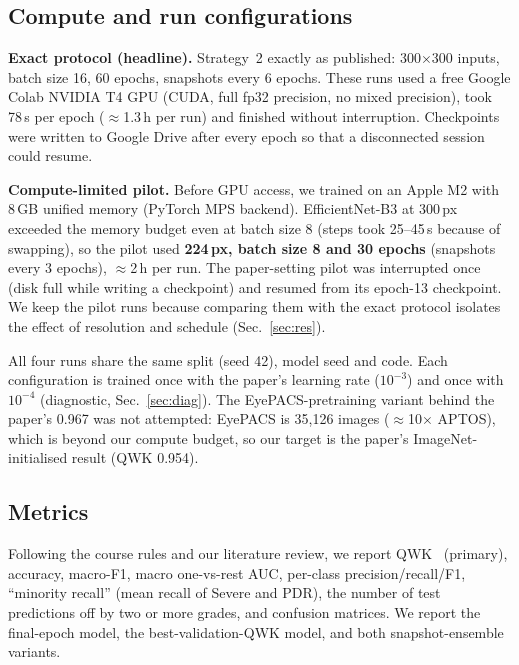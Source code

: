 \subsection{Compute and run configurations}
\textbf{Exact protocol (headline).} Strategy~2 exactly as published: 300$\times$300 inputs, batch size 16,
60 epochs, snapshots every 6 epochs. These runs used a free Google Colab NVIDIA T4 GPU (CUDA, full fp32
precision, no mixed precision), took 78\,s per epoch ($\approx$1.3\,h per run) and finished without interruption.
Checkpoints were written to Google Drive after every epoch so that a disconnected session could resume.

\textbf{Compute-limited pilot.} Before GPU access, we trained on an Apple M2 with 8\,GB unified memory (PyTorch
MPS backend). EfficientNet-B3 at 300\,px exceeded the memory budget even at batch size 8 (steps took 25--45\,s
because of swapping), so the pilot used \textbf{224\,px, batch size 8 and 30 epochs} (snapshots every 3 epochs),
$\approx$2\,h per run. The paper-setting pilot was interrupted once (disk full while writing a checkpoint) and
resumed from its epoch-13 checkpoint. We keep the pilot runs because comparing them with the exact protocol
isolates the effect of resolution and schedule (Sec.~\ref{sec:res}).

All four runs share the same split (seed 42), model seed and code. Each configuration is trained once with the
paper's learning rate ($10^{-3}$) and once with $10^{-4}$ (diagnostic, Sec.~\ref{sec:diag}).
The EyePACS-pretraining variant behind the paper's 0.967 was not attempted: EyePACS is
35{,}126 images ($\approx$10$\times$ APTOS), which is beyond our compute budget, so our target is the
paper's ImageNet-initialised result (QWK 0.954).

\subsection{Metrics}
Following the course rules and our literature review, we report QWK~\cite{cohen1968kappa} (primary), accuracy,
macro-F1, macro one-vs-rest AUC, per-class precision/recall/F1, ``minority recall'' (mean recall of Severe
and PDR), the number of test predictions off by two or more grades, and confusion matrices. We report the
final-epoch model, the best-validation-QWK model, and both snapshot-ensemble variants.
